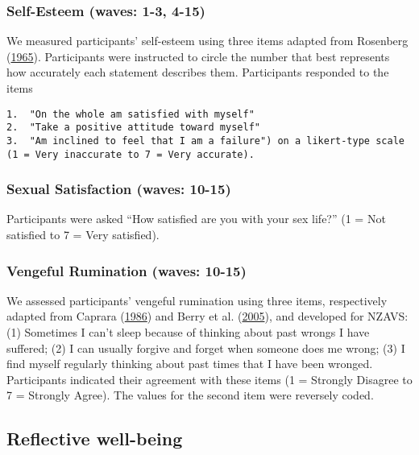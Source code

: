 \documentclass[
  singlecolumn]{report}
\begin{document}
\hypertarget{self-esteem-waves-1-3-4-15}{%
\subsubsection{Self-Esteem (waves: 1-3,
4-15)}\label{self-esteem-waves-1-3-4-15}}

We measured participants' self-esteem using three items adapted from
Rosenberg (\protect\hyperlink{ref-Rosenberg1965}{1965}). Participants
were instructed to circle the number that best represents how accurately
each statement describes them. Participants responded to the items

\begin{verbatim}
1.  "On the whole am satisfied with myself"
2.  "Take a positive attitude toward myself"
3.  "Am inclined to feel that I am a failure") on a likert-type scale (1 = Very inaccurate to 7 = Very accurate).
\end{verbatim}

\hypertarget{sexual-satisfaction-waves-10-15}{%
\subsubsection{Sexual Satisfaction (waves:
10-15)}\label{sexual-satisfaction-waves-10-15}}

Participants were asked ``How satisfied are you with your sex life?'' (1
= Not satisfied to 7 = Very satisfied).

\hypertarget{vengeful-rumination-waves-10-15}{%
\subsubsection{Vengeful Rumination (waves:
10-15)}\label{vengeful-rumination-waves-10-15}}

We assessed participants' vengeful rumination using three items,
respectively adapted from Caprara
(\protect\hyperlink{ref-caprara_indicators_1986}{1986}) and Berry et al.
(\protect\hyperlink{ref-berry_forgivingness_2005}{2005}), and developed
for NZAVS: (1) Sometimes I can't sleep because of thinking about past
wrongs I have suffered; (2) I can usually forgive and forget when
someone does me wrong; (3) I find myself regularly thinking about past
times that I have been wronged. Participants indicated their agreement
with these items (1 = Strongly Disagree to 7 = Strongly Agree). The
values for the second item were reversely coded.

\hypertarget{reflective-well-being}{%
\subsection{Reflective well-being}\label{reflective-well-being}}
\end{document}
